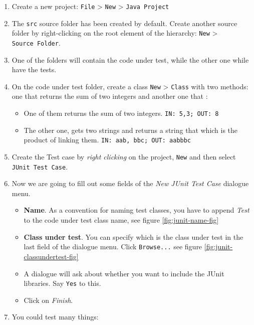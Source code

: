 \documentclass[
]{book}
\providecommand{\tightlist}{%
  \setlength{\itemsep}{0pt}\setlength{\parskip}{0pt}}
\begin{document}
\begin{enumerate}
\def\labelenumi{\arabic{enumi}.}
\tightlist
\item
  Create a new project: \texttt{File} \textgreater{} \texttt{New} \textgreater{} \texttt{Java\ Project}
\item
  The \texttt{src} source folder has been created by default. Create another source folder by right-clicking on the root element of the hierarchy: \texttt{New} \textgreater{} \texttt{Source\ Folder}.
\item
  One of the folders will contain the code under test, while the other one while have the tests.
\item
  On the code under test folder, create a class \texttt{New} \textgreater{} \texttt{Class} with two methods: one that returns the sum of two integers and another one that :

  \begin{itemize}
  \tightlist
  \item
    One of them returns the sum of two integers. \texttt{IN:\ 5,3;\ OUT:\ 8}
  \item
    The other one, gets two strings and returns a string that which is the product of linking them. \texttt{IN:\ aab,\ bbc;\ OUT:\ aabbbc}
  \end{itemize}
\item
  Create the Test case by \emph{right clicking} on the project, \texttt{New} and then select \texttt{JUnit\ Test\ Case}.
\item
  Now we are going to fill out some fields of the \emph{New JUnit Test Case} dialogue menu.

  \begin{itemize}
  \tightlist
  \item
    \textbf{Name}. As a convention for naming test classes, you have to append \emph{Test} to the code under test class name, see figure \ref{fig:junit-name-fig}
  \item
    \textbf{Class under test}. You can specify which is the class under test in the last field of the dialogue menu. Click \texttt{Browse...} see figure \ref{fig:junit-classundertest-fig}
  \item
    A dialogue will ask about whether you want to include the JUnit libraries. Say \texttt{Yes} to this.
  \item
    Click on \emph{Finish}.
  \end{itemize}
\item
  You could test many things:


\end{enumerate}
\end{document}
